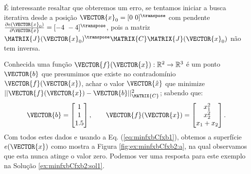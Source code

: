 \begin{SolutionT}
\label{ex:minfxbCfxb:sol2}
É interessante resaltar que obteremos um erro,
se tentamos iniciar a busca iterativa desde a posição  $\VECTOR{x}_0=[0~0]^{\transpose}$
com pendente $\frac{\partial e(\VECTOR{x}_0)}{\partial \VECTOR{x} }=[-4~-4]^{\transpose}$,
pois a matriz $\MATRIX{J}(\VECTOR{x}_0)^{\transpose}\MATRIX{C} \MATRIX{J}(\VECTOR{x}_0)$
não tem inversa.
\end{SolutionT}


\begin{example}
\label{ex:minfxbCfxb2}
Conhecida uma função $\VECTOR{f}(\VECTOR{x}) : \mathbb{R}^{2} \rightarrow \mathbb{R}^{3}$
é um ponto $\VECTOR{b}$ que presumimos que existe no contradomínio $\VECTOR{f}(\VECTOR{x})$,
achar o valor $\VECTOR{\hat{x}}$ que minimize $||\VECTOR{f}(\VECTOR{x})-\VECTOR{b}||_{\MATRIX{C}}^2$;
sabendo que:
\begin{equation}
\VECTOR{b}=\begin{bmatrix}
1\\
1\\
1.5
\end{bmatrix},
\qquad 
\VECTOR{f}(\VECTOR{x})=\begin{bmatrix}
x_1^2\\
x_2^2\\
x_1+x_2
\end{bmatrix}.
\end{equation}
Com todos estes dados e usando a Eq. (\ref{eq:minfxbCfxb1}),
obtemos a superfície $e(\VECTOR{x})$ como mostra a Figura \ref{fig:ex:minfxbCfxb2:a},
na qual observamos que esta nunca atinge o valor zero.
Podemos ver uma resposta para este exemplo na Solução \ref{ex:minfxbCfxb2:sol1}.
\end{example}

